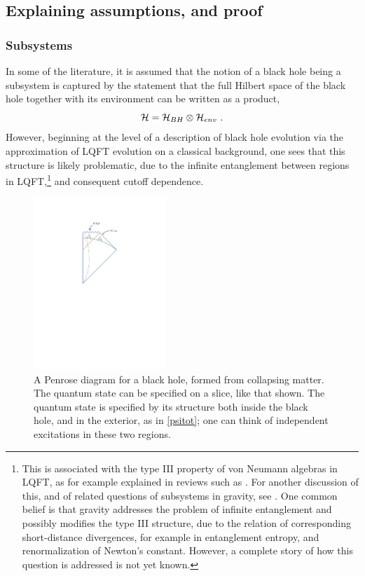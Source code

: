 \documentclass[11pt]{article}
\numberwithin{equation}{section}
\newcommand{\calh}{{\cal H}}
\newcommand{\beq}{\begin{equation}}
\newcommand{\eeq}{\end{equation}}
\begin{document}
\subsection{Explaining assumptions, and proof}

\subsubsection{Subsystems}
\label{Subs}

In some of the  literature, it is assumed that the notion of a black hole being a subsystem is captured by the statement that the full Hilbert space of the black hole together with its environment can be written as a product,
\beq\label{tensprod}
\calh = \calh_{BH}\otimes\calh_{env}\ .
\eeq
However, beginning at the level of a description of black hole evolution  via the approximation of LQFT evolution on a classical background, one sees that this structure is likely problematic, due to the infinite entanglement between regions in LQFT,\footnote{This is associated with the type III property of von Neumann algebras in LQFT, as for example explained in reviews such as \cite{Haag}.  For another discussion of this,  and of related questions of subsystems in gravity, see \cite{SGalg}.  One common belief is that gravity addresses the problem of infinite entanglement and possibly modifies the type III structure, due to the relation of corresponding short-distance divergences, for example in entanglement entropy, and renormalization of Newton's constant.  However, a complete story of how this question is addressed is not yet known.}  and consequent cutoff dependence.

\begin{figure}[!hbtp] \begin{center}
\includegraphics[width=5cm]{Fig-PenS.pdf}
\end{center}
\caption{A Penrose diagram for a black hole, formed from collapsing matter.  The quantum state can be specified on a slice, like that shown.  The quantum state is specified by its structure both inside the black hole, and in the exterior, as in \eqref{psitot}; one can think of independent excitations in these two regions.}
\label{FigPen}
\end{figure} 
\end{document}
